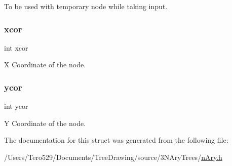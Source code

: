 To be used with temporary node while taking input. 

\hypertarget{structnode_ext_a4958a7b7ca6a973f7983d0ef569da832}{}\label{structnode_ext_a4958a7b7ca6a973f7983d0ef569da832} 
\subsubsection{\texorpdfstring{xcor}{xcor}}
{\footnotesize\ttfamily int xcor}



X Coordinate of the node. 

\hypertarget{structnode_ext_a593fcb9e99c813687d4a98bb74907995}{}\label{structnode_ext_a593fcb9e99c813687d4a98bb74907995} 
\subsubsection{\texorpdfstring{ycor}{ycor}}
{\footnotesize\ttfamily int ycor}



Y Coordinate of the node. 



The documentation for this struct was generated from the following file\+:\begin{DoxyCompactItemize}
\item 
/\+Users/\+Tero529/\+Documents/\+Tree\+Drawing/source/3\+N\+Ary\+Trees/\hyperlink{n_ary_8h}{n\+Ary.\+h}\end{DoxyCompactItemize}
